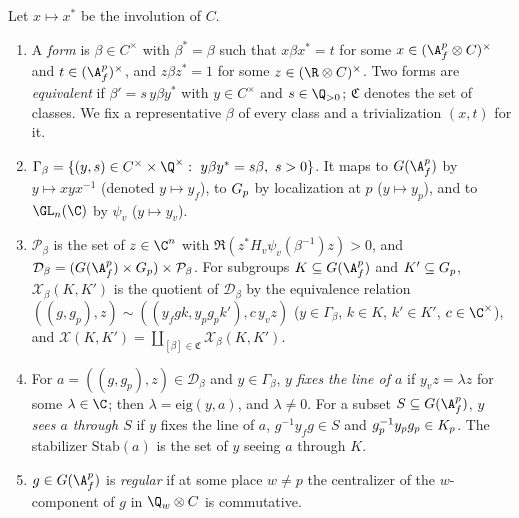 \begin{definition}\label{pf:ks2:def:forms}
Let $x\mapsto x^*$ be the involution of $C$.
\begin{enumerate}
\item A \emph{form} is $\beta\in C^\times$ with $\beta^*=\beta$ such
  that $x\beta x^*=t$ for some $x\in(\A_f^p\otimes C)^\times$ and $t\in(\A_f^p)^\times$, and
  $z\beta z^*=1$ for some $z\in(\R\otimes C)^\times$. Two forms are
  \emph{equivalent} if $\beta'=s\,y\beta y^*$ with $y\in C^\times$ and $s\in\Q_{>0}$; $\mathfrak{C}$
  denotes the set of classes. We fix a representative $\beta$ of
  every class and a trivialization $(x,t)$ for it.
\item $\Gamma_\beta=\{(y,s)\in C^\times\times\Q^\times:\ y\beta y^*=s\beta,\ s>0\}$. It maps to $\kstwoG$ by $y\mapsto xyx^{-1}$
  (denoted $y\mapsto y_f$), to $G_{p}$ by localization at $p$
  ($y\mapsto y_p$), and to $\GL_n(\C)$ by $\psi_v$
  ($y\mapsto y_v$).
\item $\mathcal{P}_\beta$ is the set of $z\in\C^n$ with $\Re(z^*H_v\psi_v(\beta^{-1})z)>0$, and $\mathcal{D}_\beta=(\kstwoG\times\kstwoGp)\times\mathcal{P}_\beta$.
  For subgroups $K\subseteq\kstwoG$ and $K'\subseteq G_{p}$, $\mathcal{X}_\beta(K,K')$ is the quotient of $\mathcal{D}_\beta$ by the equivalence
  relation $((g,g_p),z)\sim((y_fgk,y_pg_pk'),c\,y_vz)$ ($y\in\Gamma_\beta$, $k\in K$, $k'\in K'$,
  $c\in\C^\times$), and
  $\mathcal{X}(K,K')=\coprod_{[\beta]\in\mathfrak{C}}\mathcal{X}_\beta(K,K')$.
\item For $a=((g,g_p),z)\in\mathcal{D}_\beta$ and $y\in\Gamma_\beta$, $y$ \emph{fixes the line of $a$}
  if $y_vz=\lambda z$ for some $\lambda\in\C$; then
  $\lambda=\mathrm{eig}(y,a)$, and $\lambda\ne0$. For a
  subset $S\subseteq\kstwoG$, $y$ \emph{sees $a$ through $S$} if $y$
  fixes the line of $a$, $g^{-1}y_fg\in S$ and $g_p^{-1}y_pg_p\in K_{p}$. The stabilizer
  $\mathrm{Stab}(a)$ is the set of $y$ seeing $a$ through $K$.
\item $g\in\kstwoG$ is \emph{regular} if at some place $w\ne p$
  the centralizer of the $w$-component of $g$ in $\Q_w\otimes C$ is commutative.
\end{enumerate}
\end{definition}

